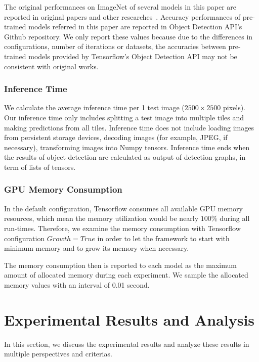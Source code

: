 \documentclass[conference]{IEEEtran}
\begin{document}
The original performances on ImageNet of several models in this paper are reported in original papers and other researches~\cite{huang2017speed}. Accuracy performances of pre-trained models referred in this paper are reported in Object Detection API's Github repository. We only report these values because due to the differences in configurations, number of iterations or datasets, the accuracies between pre-trained models provided by Tensorflow's Object Detection API may not be consistent with original works.

\subsubsection{Inference Time}
We calculate the average inference time per 1 test image ($2500 \times 2500$ pixels). Our inference time only includes splitting a test image into multiple tiles and making predictions from all tiles. Inference time does not include loading images from persistent storage devices, decoding images (for example, JPEG, if necessary), transforming images into Numpy tensors. Inference time ends when the results of object detection are calculated as output of detection graphs, in term of lists of tensors.

\subsubsection{GPU Memory Consumption}
In the default configuration, Tensorflow consumes all available GPU memory resources, which mean the memory utilization would be nearly $100\%$ during all run-times. Therefore, we examine the memory consumption with Tensorflow configuration $Growth = True$ in order to let the framework to start with minimum memory and to grow its memory when necessary. 

The memory consumption then is reported to each model as the maximum amount of allocated memory during each experiment. We sample the allocated memory values with an interval of 0.01 second.


\section{Experimental Results and Analysis}


In this section, we discuss the experimental results and analyze these results in multiple perspectives and criterias.
\end{document}
